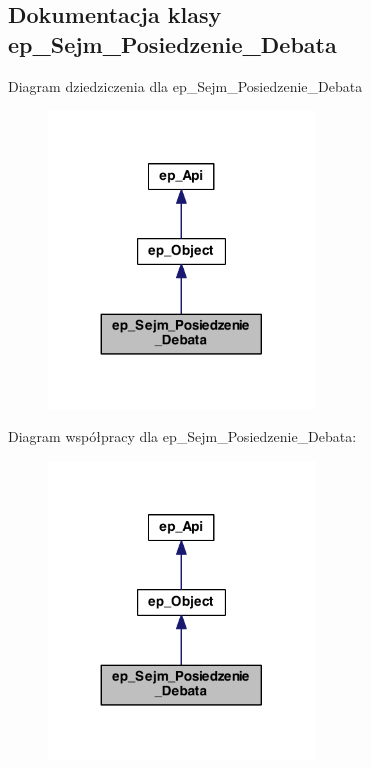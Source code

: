 \hypertarget{classep___sejm___posiedzenie___debata}{\subsection{Dokumentacja klasy ep\-\_\-\-Sejm\-\_\-\-Posiedzenie\-\_\-\-Debata}
\label{classep___sejm___posiedzenie___debata}
}


Diagram dziedziczenia dla ep\-\_\-\-Sejm\-\_\-\-Posiedzenie\-\_\-\-Debata\nopagebreak
\begin{figure}[H]
\begin{center}
\leavevmode
\includegraphics[width=200pt]{classep___sejm___posiedzenie___debata__inherit__graph}
\end{center}
\end{figure}


Diagram współpracy dla ep\-\_\-\-Sejm\-\_\-\-Posiedzenie\-\_\-\-Debata\-:\nopagebreak
\begin{figure}[H]
\begin{center}
\leavevmode
\includegraphics[width=200pt]{classep___sejm___posiedzenie___debata__coll__graph}
\end{center}
\end{figure}
